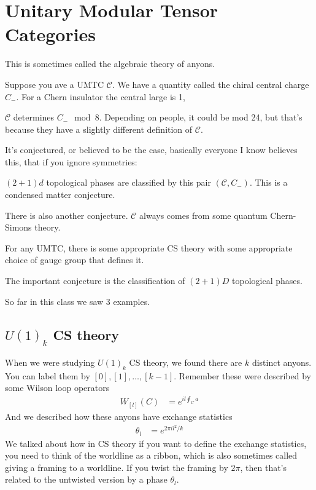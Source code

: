 \section{Unitary Modular Tensor Categories}
This is sometimes called the algebraic theory of anyons.

Suppose you ave a UMTC $\mathcal{C}$.
We have a quantity called the chiral central charge $C_-$.
For a Chern insulator the central large is 1,

$\mathcal{C}$ determines $C_- \mod 8$.
Depending on people,
it could be mod 24,
but that's because they have a slightly different definition of $\mathcal{C}$.

It's conjectured, or believed to be the case,
basically everyone I know believes this,
that if you ignore symmetries:
\begin{conjecture}
$(2+1)d$ topological phases are classified by this pair $(\mathcal{C},C_-)$.
This is a condensed matter conjecture.
\end{conjecture}


There is also another conjecture.
$\mathcal{C}$ always comes from some quantum Chern-Simons theory.

For any UMTC,
there is some appropriate CS theory with some appropriate choice of gauge group
that defines it.

The important conjecture is the classification of $(2+1)D$ topological phases.

So far in this class we saw 3 examples.

\subsection{$U(1)_k$ CS theory}
When we were studying $U(1)_k$ CS theory,
we found there are $k$ distinct anyons.
You can label them by
$[0], [1], \ldots, [k - 1]$.
Remember these were described by some Wilson loop operators
\begin{align}
    W_{[l]}(C)
    &=
    e^{i l \oint_C a}
\end{align}
And we described how these anyons have exchange statistics
\begin{align}
    \theta_l
    &=
    e^{2\pi i l^2/k}
\end{align}
We talked about how in CS theory if you want to define the exchange statistics,
you need to think of the worldline as a ribbon,
which is also sometimes called giving a framing to a worldline.
If you twist the framing by $2\pi$,
then that's related to the untwisted version by a phase $\theta_l$.


